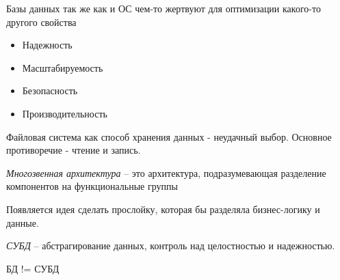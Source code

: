 \documentclass[12pt, a4paper]{article}
\begin{document}
Базы данных так же как и ОС чем-то жертвуют для оптимизации какого-то другого свойства

\begin{itemize}
    \item Надежность
    \item Масштабируемость
    \item Безопасность
    \item Производительность
\end{itemize}

Файловая система как способ хранения данных - неудачный выбор. Основное противоречие - чтение и запись.

\emph{Многозвенная архитектура} -- это архитектура, подразумевающая разделение компонентов на функциональные группы

Появляется идея сделать прослойку, которая бы разделяла бизнес-логику и данные.

\emph{СУБД} -- абстрагирование данных, контроль над целостностью и надежностью.

БД != СУБД
\end{document}
